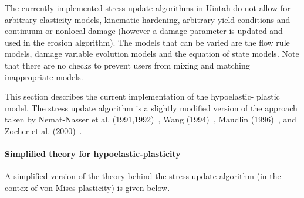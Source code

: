The currently implemented stress update algorithms in Uintah
do not allow for arbitrary elasticity models,
kinematic hardening, arbitrary yield conditions and continuum or
nonlocal damage (however a damage parameter is updated and
used in the erosion algorithm).  The models that can be varied
are the flow rule models, damage variable evolution models and the
equation of state models.  Note that there are no checks
to prevent users from mixing and matching inappropriate models.

This section describes the current implementation of the hypoelastic-
plastic model.  The stress update algorithm is a slightly modified
version of the approach taken by
Nemat-Nasser et al. (1991,1992)~\cite{Nemat91,Nemat92}, Wang (1994)~\cite{Wang94},
Maudlin (1996)~\cite{Maudlin96}, and Zocher et al. (2000)~\cite{Zocher00}.

\paragraph{Simplified theory for hypoelastic-plasticity}
A simplified version of the theory behind the stress update algorithm
(in the contex of von Mises plasticity) is given below.

